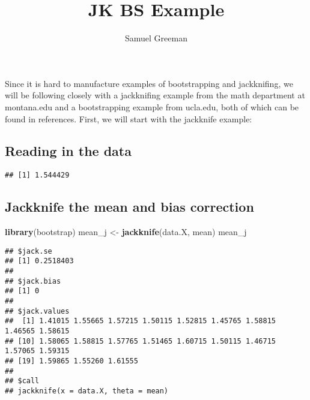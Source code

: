 \documentclass[
]{article}
\title{JK BS Example}
\author{Samuel Greeman}
\date{}
\newenvironment{Shaded}{\begin{snugshade}}{\end{snugshade}}
\newcommand{\FunctionTok}[1]{\textcolor[rgb]{0.13,0.29,0.53}{\textbf{#1}}}
\newcommand{\NormalTok}[1]{#1}
\newcommand{\OtherTok}[1]{\textcolor[rgb]{0.56,0.35,0.01}{#1}}
\newcommand{\SpecialCharTok}[1]{\textcolor[rgb]{0.81,0.36,0.00}{\textbf{#1}}}
\begin{document}
\maketitle

Since it is hard to manufacture examples of bootstrapping and
jackknifing, we will be following closely with a jackknifing example
from the math department at montana.edu and a bootstrapping example from
ucla.edu, both of which can be found in references. First, we will start
with the jackknife example:

\subsection{Reading in the data}\label{reading-in-the-data}

\begin{verbatim}
## [1] 1.544429
\end{verbatim}

\subsection{Jackknife the mean and bias
correction}\label{jackknife-the-mean-and-bias-correction}

\begin{Shaded}
\begin{Highlighting}[]
\FunctionTok{library}\NormalTok{(bootstrap)}
\NormalTok{mean\_j }\OtherTok{\textless{}{-}} \FunctionTok{jackknife}\NormalTok{(data.X, mean)}
\NormalTok{mean\_j}
\end{Highlighting}
\end{Shaded}

\begin{verbatim}
## $jack.se
## [1] 0.2518403
## 
## $jack.bias
## [1] 0
## 
## $jack.values
##  [1] 1.41015 1.55665 1.57215 1.50115 1.52815 1.45765 1.58815 1.46565 1.58615
## [10] 1.58065 1.58815 1.57765 1.51465 1.60715 1.50115 1.46715 1.57065 1.59315
## [19] 1.59865 1.55260 1.61555
## 
## $call
## jackknife(x = data.X, theta = mean)
\end{verbatim}

\begin{Shaded}
\end{Shaded}
\end{document}
